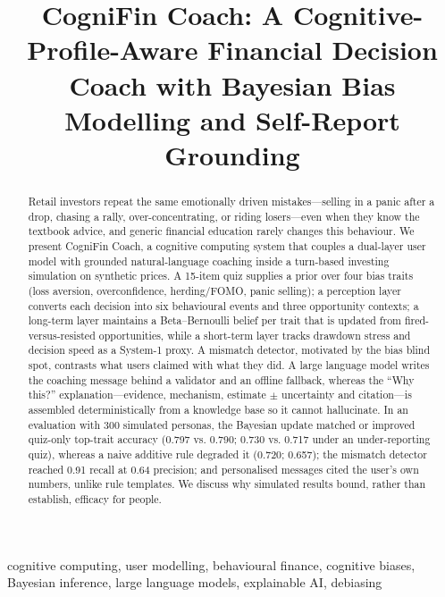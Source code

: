 \documentclass[conference]{IEEEtran}
\begin{document}
\title{CogniFin Coach: A Cognitive-Profile-Aware Financial Decision Coach with Bayesian Bias Modelling and Self-Report Grounding}
\author{}
\maketitle
\begin{abstract}
Retail investors repeat the same emotionally driven mistakes---selling in a panic after a drop, chasing a rally, over-concentrating, or riding losers---even when they know the textbook advice, and generic financial education rarely changes this behaviour. We present CogniFin Coach, a cognitive computing system that couples a dual-layer user model with grounded natural-language coaching inside a turn-based investing simulation on synthetic prices. A 15-item quiz supplies a prior over four bias traits (loss aversion, overconfidence, herding/FOMO, panic selling); a perception layer converts each decision into six behavioural events and three opportunity contexts; a long-term layer maintains a Beta--Bernoulli belief per trait that is updated from fired-versus-resisted opportunities, while a short-term layer tracks drawdown stress and decision speed as a System-1 proxy. A mismatch detector, motivated by the bias blind spot, contrasts what users claimed with what they did. A large language model writes the coaching message behind a validator and an offline fallback, whereas the ``Why this?'' explanation---evidence, mechanism, estimate \ensuremath{\pm} uncertainty and citation---is assembled deterministically from a knowledge base so it cannot hallucinate. In an evaluation with 300 simulated personas, the Bayesian update matched or improved quiz-only top-trait accuracy (0.797 vs. 0.790; 0.730 vs. 0.717 under an under-reporting quiz), whereas a naive additive rule degraded it (0.720; 0.657); the mismatch detector reached 0.91 recall at 0.64 precision; and personalised messages cited the user's own numbers, unlike rule templates. We discuss why simulated results bound, rather than establish, efficacy for people.
\end{abstract}
\begin{IEEEkeywords}
cognitive computing, user modelling, behavioural finance, cognitive biases, Bayesian inference, large language models, explainable AI, debiasing
\end{IEEEkeywords}
\end{document}
